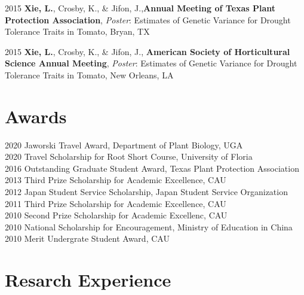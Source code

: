 \documentclass[11pt, a4paper]{awesome-cv}
\begin{document}
2015 \textbf{Xie, L.}, Crosby, K., \& Jifon, J.,\textbf{Annual Meeting
of Texas Plant Protection Association}, \emph{Poster}: Estimates of
Genetic Variance for Drought Tolerance Traits in Tomato, Bryan, TX

2015 \textbf{Xie, L.}, Crosby, K., \& Jifon, J., \textbf{American
Society of Horticultural Science Annual Meeting}, \emph{Poster}:
Estimates of Genetic Variance for Drought Tolerance Traits in Tomato,
New Orleans, LA

\section{Awards}\label{awards}

2020 Jaworski Travel Award, Department of Plant Biology, UGA\\
2020 Travel Scholarship for Root Short Course, University of Floria\\
2016 Outstanding Graduate Student Award, Texas Plant Protection
Association\\
2013 Third Prize Scholarship for Academic Excellence, CAU\\
2012 Japan Student Service Scholarship, Japan Student Service
Organization\\
2011 Third Prize Scholarship for Academic Excellence, CAU\\
2010 Second Prize Scholarship for Academic Excellenc, CAU\\
2010 National Scholarship for Encouragement, Ministry of Education in
China\\
2010 Merit Undergrate Student Award, CAU

\section{Resarch Experience}\label{resarch-experience}
\end{document}
